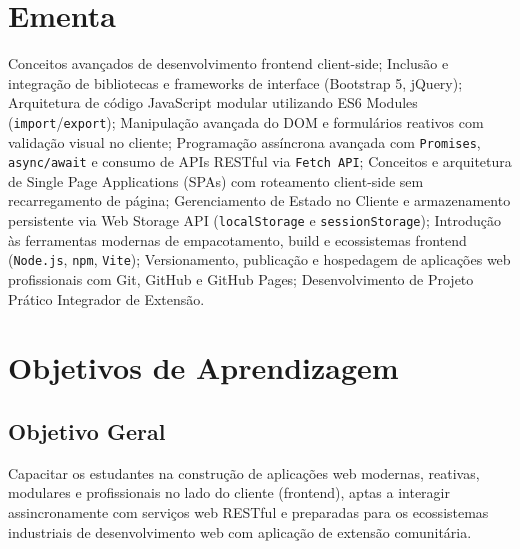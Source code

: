 \documentclass[12pt,a4paper]{article}
\begin{document}
\section{Ementa}

Conceitos avançados de desenvolvimento frontend client-side; Inclusão e integração de bibliotecas e frameworks de interface (Bootstrap 5, jQuery); Arquitetura de código JavaScript modular utilizando ES6 Modules (\texttt{import}/\texttt{export}); Manipulação avançada do DOM e formulários reativos com validação visual no cliente; Programação assíncrona avançada com \texttt{Promises}, \texttt{async/await} e consumo de APIs RESTful via \texttt{Fetch API}; Conceitos e arquitetura de Single Page Applications (SPAs) com roteamento client-side sem recarregamento de página; Gerenciamento de Estado no Cliente e armazenamento persistente via Web Storage API (\texttt{localStorage} e \texttt{sessionStorage}); Introdução às ferramentas modernas de empacotamento, build e ecossistemas frontend (\texttt{Node.js}, \texttt{npm}, \texttt{Vite}); Versionamento, publicação e hospedagem de aplicações web profissionais com Git, GitHub e GitHub Pages; Desenvolvimento de Projeto Prático Integrador de Extensão.

\section{Objetivos de Aprendizagem}

\subsection{Objetivo Geral}
Capacitar os estudantes na construção de aplicações web modernas, reativas, modulares e profissionais no lado do cliente (frontend), aptas a interagir assincronamente com serviços web RESTful e preparadas para os ecossistemas industriais de desenvolvimento web com aplicação de extensão comunitária.
\end{document}

